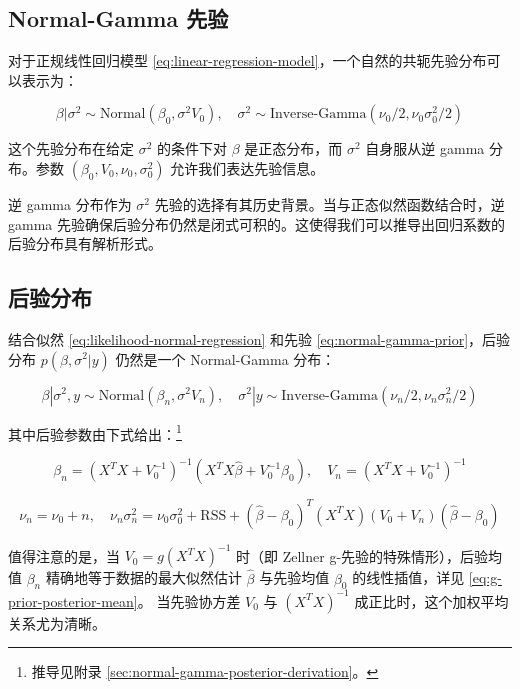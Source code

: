 \subsection{Normal-Gamma 先验}

对于正规线性回归模型 \cref{eq:linear-regression-model}，一个自然的共轭先验分布可以表示为：

\begin{equation}
\beta | \sigma^2 \sim \text{Normal}(\beta_0, \sigma^2 V_0), \quad \sigma^2 \sim \text{Inverse-Gamma}(\nu_0/2, \nu_0\sigma_0^2/2)
\label{eq:normal-gamma-prior}
\end{equation}

这个先验分布在给定 $\sigma^2$ 的条件下对 $\beta$ 是正态分布，而 $\sigma^2$ 自身服从逆 gamma 分布。参数 $(\beta_0, V_0, \nu_0, \sigma_0^2)$ 允许我们表达先验信息。

\begin{Remark}
  逆 gamma 分布作为 $\sigma^2$ 先验的选择有其历史背景。当与正态似然函数结合时，逆 gamma 先验确保后验分布仍然是闭式可积的。这使得我们可以推导出回归系数的后验分布具有解析形式。
\end{Remark}

\subsection{后验分布}

结合似然 \cref{eq:likelihood-normal-regression} 和先验 \cref{eq:normal-gamma-prior}，后验分布 $p(\beta, \sigma^2 | y)$ 仍然是一个 Normal-Gamma 分布：

\begin{equation}
\beta | \sigma^2, y \sim \text{Normal}(\beta_n, \sigma^2 V_n), \quad \sigma^2 | y \sim \text{Inverse-Gamma}(\nu_n/2, \nu_n\sigma_n^2/2)
\label{eq:normal-gamma-posterior}
\end{equation}

其中后验参数由下式给出：\footnote{推导见附录 \cref{sec:normal-gamma-posterior-derivation}。}

\[
\beta_n = (X^TX + V_0^{-1})^{-1}(X^T X\hat{\beta} + V_0^{-1}\beta_0), \quad V_n = (X^TX + V_0^{-1})^{-1}
\]

\[
\nu_n = \nu_0 + n, \quad \nu_n\sigma_n^2 = \nu_0\sigma_0^2 + \text{RSS} + (\hat{\beta} - \beta_0)^T(X^TX)(V_0 + V_n)(\hat{\beta} - \beta_0)
\]

值得注意的是，当 $V_0 = g(X^TX)^{-1}$ 时（即 Zellner g-先验的特殊情形），后验均值 $\beta_n$ 精确地等于数据的最大似然估计 $\hat{\beta}$ 与先验均值 $\beta_0$ 的线性插值，详见 \cref{eq:g-prior-posterior-mean}。
当先验协方差 $V_0$ 与 $(X^TX)^{-1}$ 成正比时，这个加权平均关系尤为清晰。

